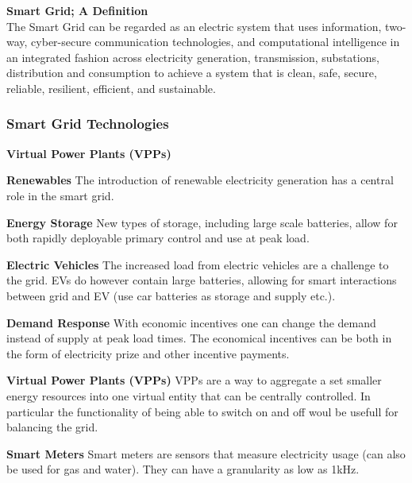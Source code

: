 \begin{tcolorbox}
\textbf{Smart Grid; A Definition}\\
The Smart Grid can be regarded as an electric system
that uses information, two-way, cyber-secure
communication technologies, and computational
intelligence in an integrated fashion across electricity
generation, transmission, substations, distribution and
consumption to achieve a system that is clean, safe,
secure, reliable, resilient, efficient, and sustainable.
\end{tcolorbox}

\subsubsection{Smart Grid Technologies}
\begin{labeling}{\textbf{Virtual Power Plants (VPPs)}}
    \item [\textbf{Renewables}]
    The introduction of renewable electricity generation has a central role in the smart grid.

    \item [\textbf{Energy Storage}]
    New types of storage, including large scale batteries, allow for both rapidly deployable primary control and use at peak load.

    \item [\textbf{Electric Vehicles}]
    The increased load from electric vehicles are a challenge to the grid.
    EVs do however contain large batteries, allowing for smart interactions between grid and EV (use car batteries as storage and supply etc.).

    \item [\textbf{Demand Response}]
    With economic incentives one can change the demand instead of supply at peak load times.
    The economical incentives can be both in the form of electricity prize and other incentive payments.

    \item [\textbf{Virtual Power Plants (VPPs)}]
    VPPs are a way to aggregate a set smaller energy resources into one virtual entity that can be centrally controlled.
    In particular the functionality of being able to switch on and off woul be usefull for balancing the grid.

    \item [\textbf{Smart Meters}]
    Smart meters are sensors that measure electricity usage (can also be used for gas and water). They can have a granularity as low as 1kHz.



\end{labeling}

